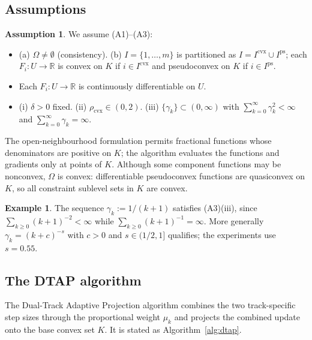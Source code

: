 \documentclass[]{interact}
\theoremstyle{plain}
\theoremstyle{definition}
\newtheorem{example}[theorem]{Example}
\newtheorem{assumption}{Assumption}
\theoremstyle{remark}
\newcommand{\R}{\mathbb{R}}
\newcommand{\cvx}{\mathrm{cvx}}
\newcommand{\ps}{\mathrm{ps}}
\begin{document}
\subsection{Assumptions}\label{ssec:assumptions}
\begin{assumption}\label{ass:standing}
We assume \textup{(A1)--(A3)}:
\begin{itemize}[leftmargin=2.4em,itemsep=2pt]
\item[\textup{(A1)}] \textup{(a)} $\Omega\ne\emptyset$ (consistency). \textup{(b)} $I=\{1,\dots,m\}$
is partitioned as $I=I^{\cvx}\cup I^{\ps}$; each $F_i:U\to\R$ is convex on $K$ if
$i\in I^{\cvx}$ and pseudoconvex on $K$ if $i\in I^{\ps}$.
\item[\textup{(A2)}] Each $F_i:U\to\R$ is continuously differentiable on $U$.
\item[\textup{(A3)}] \textup{(i)} $\delta>0$ fixed. \textup{(ii)}
$\rho_{\cvx}\in(0,2)$. \textup{(iii)} $\{\gamma_k\}\subset(0,\infty)$ with
$\sum_{k=0}^\infty\gamma_k^2<\infty$ and $\sum_{k=0}^\infty\gamma_k=\infty$.
\end{itemize}
\end{assumption}
The open-neighbourhood formulation permits fractional functions whose denominators are
positive on $K$; the algorithm evaluates the functions and gradients only at points of $K$.
Although some component functions may be nonconvex, $\Omega$ is convex: differentiable
pseudoconvex functions are quasiconvex on $K$, so all constraint sublevel sets in $K$ are convex.
\begin{example}\label{ex:gamma}
The sequence $\gamma_k:=1/(k+1)$ satisfies (A3)(iii), since $\sum_{k\ge0}(k+1)^{-2}<\infty$
while $\sum_{k\ge0}(k+1)^{-1}=\infty$. More generally $\gamma_k=(k+c)^{-s}$ with $c>0$
and $s\in(1/2,1]$ qualifies; the experiments use $s=0.55$.
\end{example}

\subsection{The DTAP algorithm}\label{ssec:algorithm}
The Dual-Track Adaptive Projection algorithm combines the two track-specific step sizes
through the proportional weight $\mu_k$ and projects the combined update onto the base convex
set $K$. It is stated as Algorithm~\ref{alg:dtap}.
\end{document}
